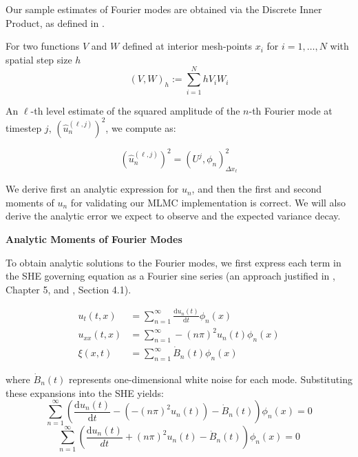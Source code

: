 Our sample estimates of Fourier modes are obtained via the Discrete Inner Product,
as defined in \cite{suli2025nspdes}.

\begin{definition}
    \label{def:discrete_inner_product}
    For two functions $V$ and $W$ defined at interior mesh-points 
    $x_i$ for $i = 1, \dots, N$ with spatial step size $h$
    \begin{equation*}
        (V,W)_h := \sum_{i = 1}^{N} h V_i W_i
    \end{equation*}
\end{definition}

An $\ell$-th level estimate of the squared amplitude of the $n$-th Fourier mode
at timestep $j$, $(\hat{u}_n^{(\ell,j)})^2$, we compute as:

\begin{equation*}
    (\hat{u}_n^{(\ell, j)})^2 = \left(U^j, \phi_n\right)_{\Delta x_\ell}^2
\end{equation*}

We derive first an analytic expression for $u_n$, 
and then the first and second moments of $u_n$ for validating our 
MLMC implementation is correct. We will also derive the 
analytic error we expect to observe and 
the expected variance decay. 
\newline

\textbf{Analytic Moments of Fourier Modes}

To obtain analytic solutions to the Fourier modes, we first express each term 
in the SHE governing equation as a Fourier sine series (an approach justified 
in \cite{strauss2007partial}, Chapter 5, and \cite{da2014stochastic}, Section 4.1).

$$
\begin{aligned} 
    u_t(t,x) &= \sum_{n=1}^\infty \frac{\mathrm{d}u_n(t)}{\mathrm{d}t}\phi_n(x) \\ 
    u_{xx}(t,x) &= \sum_{n=1}^\infty -(n\pi)^2 u_n(t)\phi_n(x) \\ 
    \xi(x,t) &= \sum_{n=1}^\infty \dot{B}_n(t) \phi_n(x) 
\end{aligned}
$$

where $\dot{B}_n(t)$ represents one-dimensional white noise for each mode.
Substituting these expansions into the SHE yields:
$$\sum_{n=1}^\infty \left( \frac{\mathrm{d}u_n(t)}{\mathrm{d}t} - (-(n\pi)^2 u_n(t)) 
- \dot{B}_n(t) \right) \phi_n(x) = 0$$ $$\sum_{n=1}^\infty \left( \frac{\mathrm{d}u_n(t)}{dt}
 + (n\pi)^2 u_n(t) - \dot{B}_n(t) \right) \phi_n(x) = 0
 $$

